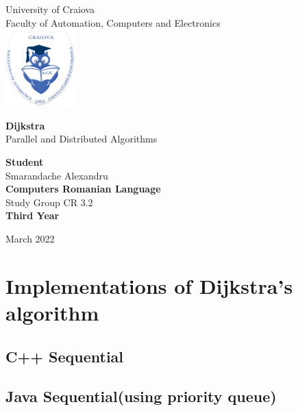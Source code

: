 \documentclass[14ppt]{article}
\begin{document}
\begin{titlepage}
    \begin{center}
    \Large
        University of Craiova\\
        Faculty of Automation, Computers and Electronics\\
         \includegraphics[width=0.2\textwidth]{ace.png}
        \vspace*{2cm}
            
        \Huge{\textbf{Dijkstra}\\}
        \vspace{0.3cm}
        \Large
        Parallel and Distributed Algorithms
            
        \vspace{1.5cm}
            
        \Large \textbf{Student}\\ Smarandache Alexandru
        \\\vspace{0.25cm}
        \Large{\textbf{Computers Romanian Language }}\\
        \Large{Study Group CR 3.2}\\
         \Large{\textbf{Third Year}}\\
        \vfill
    
        \vspace{0.8cm}
            
        \Large
        March 2022
    \end{center}
\end{titlepage}
\begin{center}
\tableofcontents
\end{center}

\newpage
\section{Implementations of Dijkstra's algorithm}
\subsection{C++ Sequential}
\subsection{Java Sequential(using priority queue)}
\end{document}
